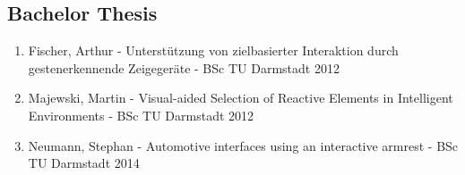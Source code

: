 \begin{appendix}
\section{Bachelor Thesis}

\begin{enumerate}
\item Fischer, Arthur - Unterstützung von zielbasierter Interaktion durch gestenerkennende Zeigegeräte - BSc TU Darmstadt 2012
\item Majewski, Martin - Visual-aided Selection of Reactive Elements in Intelligent Environments - BSc TU Darmstadt 2012
\item Neumann, Stephan - Automotive interfaces using an interactive armrest - BSc TU Darmstadt 2014
\end{enumerate}

 

\end{appendix}




